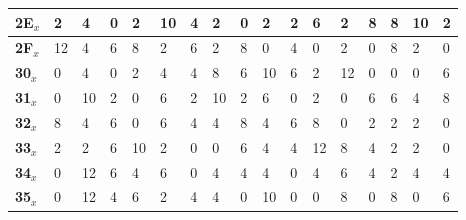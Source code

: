 \begin{longtable}[c]{|l|l|l|l|l|l|l|l|l|l|l|l|l|l|l|l|l|}
\textbf{2E$_x$} & 2              & 4              & 0              & 2              & 10             & 4              & 2              & 0              & 2              & 2              & 6              & 2              & 8              & 8              & 10             & 2              \\ \hline
\textbf{2F$_x$} & 12             & 4              & 6              & 8              & 2              & 6              & 2              & 8              & 0              & 4              & 0              & 2              & 0              & 8              & 2              & 0              \\ \hline
\textbf{30$_x$} & 0              & 4              & 0              & 2              & 4              & 4              & 8              & 6              & 10             & 6              & 2              & 12             & 0              & 0              & 0              & 6              \\ \hline
\textbf{31$_x$} & 0              & 10             & 2              & 0              & 6              & 2              & 10             & 2              & 6              & 0              & 2              & 0              & 6              & 6              & 4              & 8              \\ \hline
\textbf{32$_x$} & 8              & 4              & 6              & 0              & 6              & 4              & 4              & 8              & 4              & 6              & 8              & 0              & 2              & 2              & 2              & 0              \\ \hline
\textbf{33$_x$} & 2              & 2              & 6              & 10             & 2              & 0              & 0              & 6              & 4              & 4              & 12             & 8              & 4              & 2              & 2              & 0              \\ \hline
\textbf{34$_x$} & 0              & 12             & 6              & 4              & 6              & 0              & 4              & 4              & 4              & 0              & 4              & 6              & 4              & 2              & 4              & 4              \\ \hline
\textbf{35$_x$} & 0              & 12             & 4              & 6              & 2              & 4              & 4              & 0              & 10             & 0              & 0              & 8              & 0              & 8              & 0              & 6              \\ \hline

\end{longtable}
